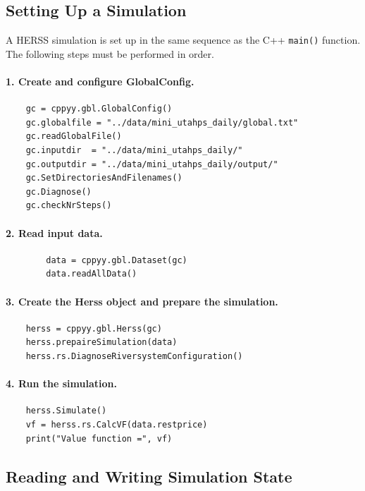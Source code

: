 \documentclass[a4paper, 12pt]{report}
\begin{document}
	\subsection{Setting Up a Simulation}

	A HERSS simulation is set up in the same sequence as the C++ \texttt{main()}
	function. The following steps must be performed in order.

	\paragraph{1. Create and configure GlobalConfig.}
	\begin{verbatim}
	gc = cppyy.gbl.GlobalConfig()
	gc.globalfile = "../data/mini_utahps_daily/global.txt"
	gc.readGlobalFile()
	gc.inputdir  = "../data/mini_utahps_daily/"
	gc.outputdir = "../data/mini_utahps_daily/output/"
	gc.SetDirectoriesAndFilenames()
	gc.Diagnose()
	gc.checkNrSteps()
	\end{verbatim}

	\paragraph{2. Read input data.}
	\begin{verbatim}
		data = cppyy.gbl.Dataset(gc)
		data.readAllData()
	\end{verbatim}

	\paragraph{3. Create the Herss object and prepare the simulation.}
	\begin{verbatim}
	herss = cppyy.gbl.Herss(gc)
	herss.prepaireSimulation(data)
	herss.rs.DiagnoseRiversystemConfiguration()
	\end{verbatim}

	\paragraph{4. Run the simulation.}
	\begin{verbatim}
	herss.Simulate()
	vf = herss.rs.CalcVF(data.restprice)
	print("Value function =", vf)
	\end{verbatim}

	\subsection{Reading and Writing Simulation State}
\end{document}
